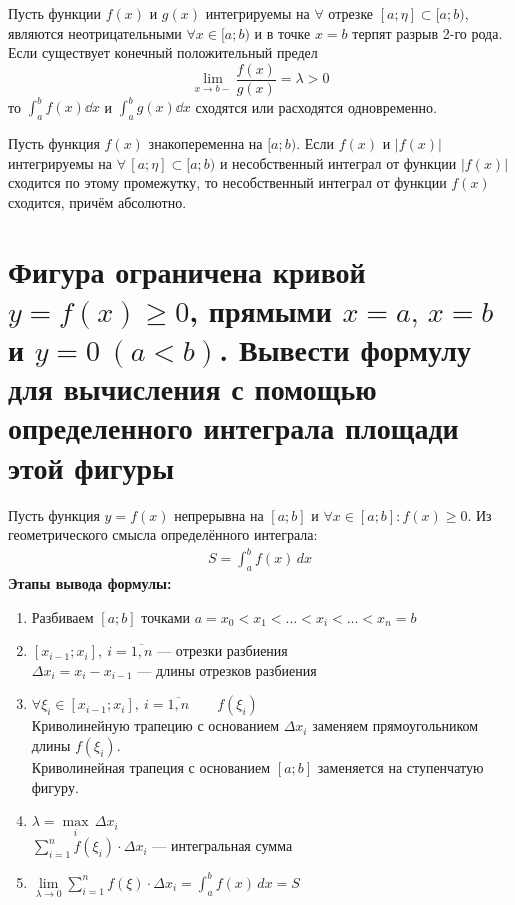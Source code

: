 \begin{theorem}
    Пусть функции $f(x)$ и $g(x)$ интегрируемы на $\forall$ отрезке $[a; \eta] \subset [a; b)$, являются неотрицательными $\forall x \in [a;b)$ и в точке $x = b$ терпят разрыв 2-го рода. Если существует конечный положительный предел
    \[
        \lim\limits_{x \to b-} \frac{f(x)}{g(x)} = \lambda > 0
    \]
    то $\int_{a}^{b} f(x)\dd{x}$ и $\int_{a}^{b} g(x)\dd{x}$ сходятся или расходятся одновременно.
\end{theorem}

\begin{theorem}
    Пусть функция $f(x)$ знакопеременна на $[a;b)$. Если $f(x)$ и $|f(x)|$ интегрируемы на $\forall\, [a; \eta] \subset [a;b)$ и несобственный интеграл от функции $|f(x)|$ сходится по этому промежутку, то несобственный интеграл от функции $f(x)$ сходится, причём абсолютно.
\end{theorem}

\section{Фигура ограничена кривой $y=f(x) \geqslant 0$, прямыми $x=a,\, x=b$ и ${y=0\ (a<b)}$. Вывести формулу для вычисления с помощью определенного интеграла площади этой фигуры} 
\setcounter{equation}{0}
Пусть функция $y = f(x)$ непрерывна на $[a;b]$ и $\forall x  \in [a;b]\colon f(x) \geqslant 0$. Из геометрического смысла определённого интеграла:
\begin{gather}
     \boxed{S = \int_{a}^{b} f(x)\, dx}
\end{gather}
\textbf{Этапы вывода формулы:}
\begin{enumerate}
    \item Разбиваем $[a;b]$ точками $a = x_0 < x_1 < \ldots < x_i < \ldots < x_n = b$
    \item $[x_{i-1}; x_i],\ i = \overline{1, n}$ --- отрезки разбиения \\
    $\Delta x_i = x_i - x_{i-1}$ --- длины отрезков разбиения
    \item $\forall \xi_i \in [x_{i-1}; x_i],\ i = \overline{1, n}\qquad f(\xi_i)$ \\
    Криволинейную трапецию с основанием $\Delta x_i$ заменяем прямоугольником длины $f(\xi_i)$. \\ 
    Криволинейная трапеция с основанием $[a;b]$ заменяется на ступенчатую фигуру.
    \item $\lambda = \underset{i}{\max}\, \Delta x_i$ \\
    $\displaystyle\sum_{i=1}^{n} f(\xi_i)\cdot \Delta x_i$ --- интегральная сумма
    \item $\displaystyle\lim\limits_{\lambda \to 0} \sum_{i=1}^{n} f(\xi)\cdot \Delta x_i = \boxed{\int_{a}^{b} f(x)\, dx = S}$
\end{enumerate}

